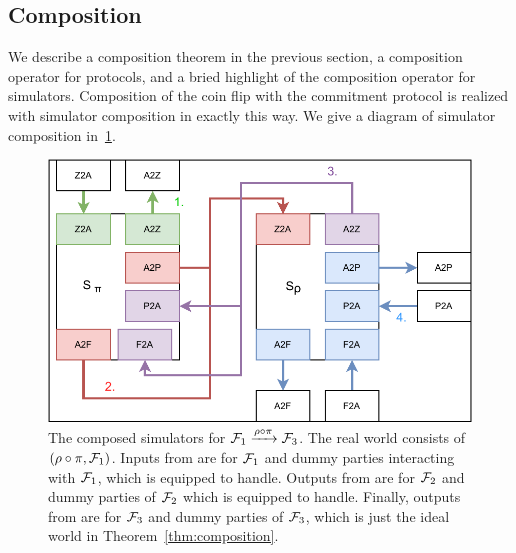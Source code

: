 \subsection{Composition}
We describe a composition theorem in the previous section, a composition operator for protocols, and a bried highlight of the composition operator for simulators.
Composition of the coin flip with the commitment protocol is realized with simulator composition in exactly this way.
We give a diagram of simulator composition in~\ref{fig:simcomp}.
\begin{figure}
\centering
\includegraphics[scale=0.5]{figures/simcomp.pdf}
\caption{The composed simulators for $\mathcal{F}_1 \xrightarrow{\rho \circ \pi} \mathcal{F}_3$. The real world consists of $(\rho \circ \pi, \mathcal{F}_1)$. Inputs from \Z are for $\mathcal{F}_1$ and dummy parties interacting with $\mathcal{F}_1$, which \SIM{\pi} is equipped to handle. Outputs from \SIM{\pi} are for $\mathcal{F}_2$ and dummy parties of $\mathcal{F}_2$ which \SIM{\rho} is equipped to handle. Finally, outputs from \SIM{\rho} are for $\mathcal{F}_3$ and dummy parties of $\mathcal{F}_3$, which is just the ideal world in Theorem~\ref{thm:composition}.}
\label{fig:simcomp}
\end{figure}
